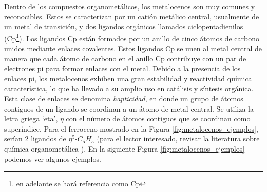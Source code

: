 Dentro de los compuestos organometálicos, los metalocenos son muy comunes y reconocibles. Estos se caracterizan por un catión metálico central, usualmente de un metal de transición, y dos ligandos orgánicos llamados ciclopentadienilos (Cp\footnote{en adelante se hará referencia como Cp}). Los ligandos Cp están formados por un anillo de cinco átomos de carbono unidos mediante enlaces covalentes. Estos ligandos Cp se unen al metal central de manera que cada átomo de carbono en el anillo Cp contribuye con un par de electrones pi para formar enlaces con el metal. Debido a la presencia de los enlaces pi, los metalocenos exhiben una gran estabilidad y reactividad química característica, lo que ha llevado a su amplio uso en catálisis y síntesis orgánica. Esta clase de enlaces se denomina \textit{hapticidad}, en donde un grupo de átomos contiguos de un ligando se coordinan a un átomo de metal central. Se utiliza la letra griega `eta', $\eta$ con el número de átomos contiguos que se coordinan como superíndice. Para el ferroceno mostrado en la Figura \ref{fig:metalocenos_ejemplos}, serían 2 ligandos de $\eta^{5}$-$C_{5}H_{5}$ (para el lector interesado, revisar la literatura sobre química organometálica \cite{jose_curso_1995, fajarnes_quimica_1997, osorio-yanez_compuestos_2021, organometallic_hypertextbook, libretext_organometallic_2013}). En la siguiente Figura \ref{fig:metalocenos_ejemplos} podemos ver algunos ejemplos.
